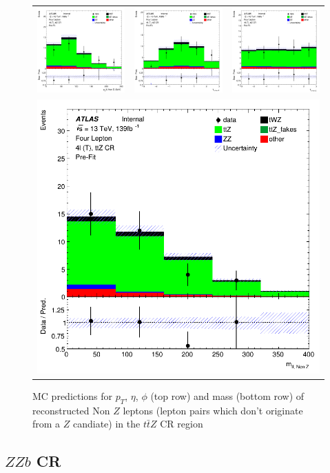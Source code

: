 \clearpage
\begin{figure}[htbp]
\centering
  \begin{tabular}{ccc}

    \includegraphics[width=.2\textwidth]{figures/PreFitPlots/lep4_ttZ_4T_nonZll_sys_pt}&
    \includegraphics[width=.2\textwidth]{figures/PreFitPlots/lep4_ttZ_4T_nonZll_sys_eta} &
    \includegraphics[width=.2\textwidth]{figures/PreFitPlots/lep4_ttZ_4T_nonZll_sys_phi} \\
    \multicolumn{3}{c}{\includegraphics[width=.2\textwidth]{figures/PreFitPlots/lep4_ttZ_4T_nonZll_sys_mass}}

  \end{tabular}
      \caption{MC predictions for $p_{T}$, $\eta$, $\phi$ (top row) and mass (bottom row) of reconstructed Non $Z$ leptons (lepton pairs which don't originate from a $Z$ candiate) in the $t\bar{t}Z$ CR region }
  \label{fig:4lep-ttZ-CR-NonZLeps-sys-Plots}
\end{figure}


\subsection{$ZZb$ CR}
\label{sec:app-controlplotstetralepton-ZZb-CR}



